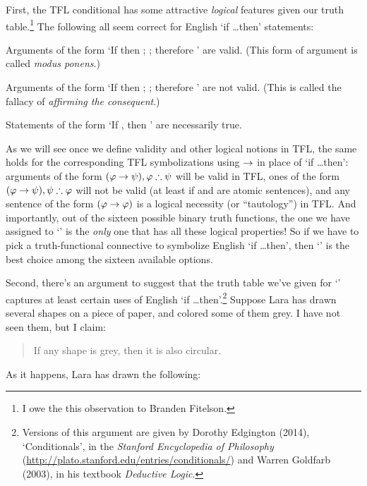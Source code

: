First, the TFL conditional has some attractive \emph{logical} features given our truth table.\footnote{I owe the this observation to Branden Fitelson.}  The following all seem correct for English `if \ldots then' statements:
\begin{ebullet}
\item Arguments of the form `If \meta{\varphi} then \meta{\psi}; \meta{\varphi}; therefore \meta{\psi}' are valid.  (This form of argument is called \emph{modus ponens}.)
\item Arguments of the form `If \meta{\varphi} then \meta{\psi}; \meta{\psi}; therefore \meta{\varphi}' are not valid.  (This is called the fallacy of \emph{affirming the consequent}.)
\item Statements of the form `If \meta{\varphi}, then \meta{\varphi}' are necessarily true.
\end{ebullet}
As we will see once we define validity and other logical notions in TFL, the same holds for the corresponding TFL symbolizations using $\rightarrow$ in place of `if \ldots then': arguments of the form $(\mathcal{\varphi} \rightarrow \mathcal{\psi}), \mathcal{\varphi} \therefore \mathcal{\psi}$ will be valid in TFL, ones of the form $(\mathcal{\varphi} \rightarrow \mathcal{\psi}), \mathcal{\psi} \therefore \mathcal{\varphi}$ will not be valid (at least if \meta{\varphi} and \meta{\psi} are atomic sentences), and any sentence of the form $(\mathcal{\varphi} \rightarrow \mathcal{\varphi})$ is a logical necessity (or ``tautology'') in TFL.  And importantly, out of the sixteen possible binary truth functions, the one we have assigned to `\eif' is the \emph{only} one that has all these logical properties!  So if we have to pick a truth-functional connective to symbolize English `if \ldots then', then `\eif' is the best choice among the sixteen available options.

Second, there's an argument to suggest that the truth table we've given for `\eif' captures at least certain uses of English `if \ldots then'.\footnote{Versions of this argument are given by Dorothy Edgington (2014), `Conditionals', in the \emph{Stanford Encyclopedia of Philosophy} (\url{http://plato.stanford.edu/entries/conditionals/}) and Warren Goldfarb (2003), in his textbook \emph{Deductive Logic}.}    Suppose Lara has drawn several shapes on a piece of paper, and colored some of them grey. I have not seen them, but I claim:
	\begin{quote}
		If any shape is grey, then it is also circular.
	\end{quote}
As it happens, Lara has drawn the following:

